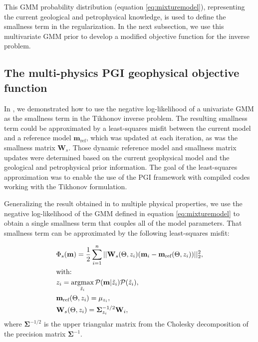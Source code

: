 \documentclass[extra, mreferee]{gji_joint} %
\begin{document}
This GMM probability distribution (equation \eqref{eq:mixturemodel}), representing the current geological and petrophysical knowledge, is used to define the smallness term in the regularization. In the next subsection, we use this multivariate GMM prior to develop a modified objective function for the inverse problem.

\subsection{The multi-physics PGI geophysical objective function}

In \citet{ggz389}, we demonstrated how to use the negative log-likelihood of a univariate GMM as the smallness term in the Tikhonov inverse problem. The resulting smallness term could be approximated by a least-squares misfit between the current model and a reference model $\mathbf{m}_{\text{ref}}$, which was updated at each iteration, as was the smallness matrix $\mathbf{W}_s$. Those dynamic reference model and smallness matrix updates were determined based on the current geophysical model and the geological and petrophysical prior information. The goal of the least-squares approximation was to enable the use of the PGI framework with compiled codes working with the Tikhonov formulation.

Generalizing the result obtained in \citet{ggz389} to multiple physical properties, we use the negative log-likelihood of the GMM defined in equation \eqref{eq:mixturemodel} to obtain a single smallness term that couples all of the model parameters. That smallness term can be approximated by the following least-squares misfit:

\begin{align}
&\Phi_s(\mathbf{m}) = \frac{1}{2}\sum_{i=1}^n||\mathbf{W}_{s}(\Theta, z_i)(\mathbf{m}_i-\mathbf{m}_{\text{ref}}(\Theta, z_i))||_2^2 \label{eq:smallness_petro},\\
&\text{with:}\nonumber\\
&z_i = \mathop{\hbox{argmax}}\limits_{\tilde{z}_i}\mathcal{P}(\mathbf{m}|\tilde{z}_i)\mathcal{P}(\tilde{z}_i) \label{eq:membership}, \\
&\mathbf{m}_{\text{ref}}(\Theta, z_i) = \mathbf{\mu}_{z_i} \label{eq:mref_update},\\
&\mathbf{W}_{s}(\Theta, z_i) = \mathbf{\Sigma}_{z_i}^{-1/2} \mathbf{W}_i\label{eq:Ws_update},
\end{align}
where $\mathbf{\Sigma}^{-1/2}$ is the upper triangular matrix from the Cholesky decomposition of the precision matrix $\mathbf{\Sigma}^{-1}$.
\end{document}
